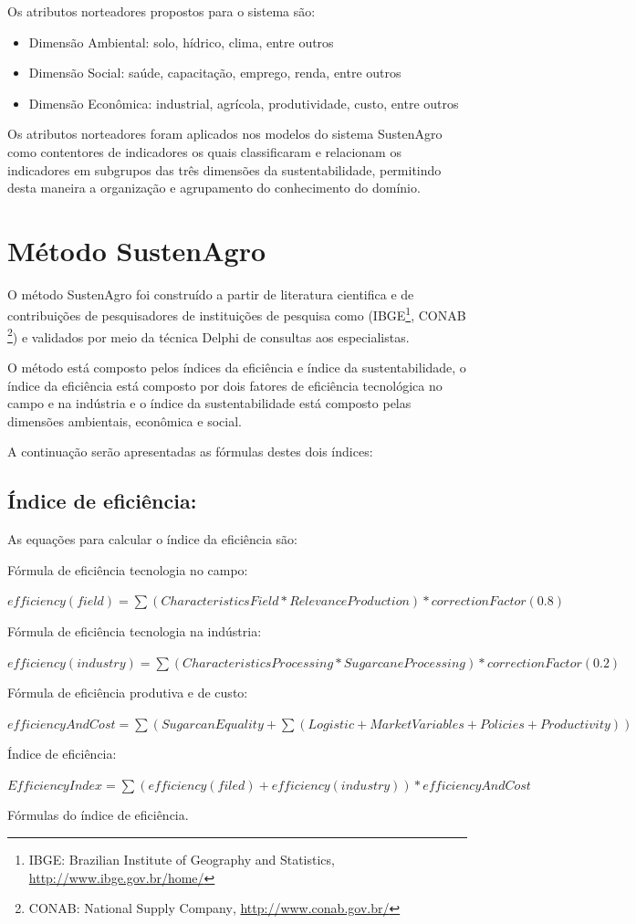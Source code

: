 Os atributos norteadores propostos para o sistema são:
\begin{itemize}
\item Dimensão Ambiental: solo, hídrico, clima, entre outros
\item Dimensão Social: saúde, capacitação, emprego, renda, entre outros
\item Dimensão Econômica: industrial, agrícola, produtividade, custo, entre
outros
\end{itemize}
Os atributos norteadores foram aplicados nos modelos do sistema SustenAgro
como contentores de indicadores os quais classificaram e relacionam
os indicadores em subgrupos das três dimensões da sustentabilidade,
permitindo desta maneira a organização e agrupamento do conhecimento
do domínio.

\section{Método SustenAgro}

O método SustenAgro foi construído a partir de literatura cientifica
e de contribuições de pesquisadores de instituições de pesquisa como
(IBGE\footnote{IBGE: \foreignlanguage{english}{Brazilian Institute of Geography and
Statistics}, \url{http://www.ibge.gov.br/home/}}, CONAB \footnote{CONAB: \foreignlanguage{english}{National Supply Company}, \url{http://www.conab.gov.br/}})
e validados por meio da técnica \foreignlanguage{english}{Delphi}
de consultas aos especialistas.

O método está composto pelos índices da eficiência e índice da sustentabilidade,
o índice da eficiência está composto por dois fatores de eficiência
tecnológica no campo e na indústria e o índice da sustentabilidade
está composto pelas dimensões ambientais, econômica e social.

A continuação serão apresentadas as fórmulas destes dois índices:

\subsection*{Índice de eficiência:}

As equações para calcular o índice da eficiência são:

\begin{algorithm}[h]
Fórmula de eficiência tecnologia no campo:

$efficiency(field)=\sum(CharacteristicsField*RelevanceProduction)*correctionFactor(0.8)$

Fórmula de eficiência tecnologia na indústria:

$efficiency(industry)=\sum(CharacteristicsProcessing*SugarcaneProcessing)*correctionFactor(0.2)$

Fórmula de eficiência produtiva e de custo:

$efficiencyAndCost=\sum(SugarcanEquality+\sum(Logistic+MarketVariables+Policies+Productivity))$

Índice de eficiência:

$EfficiencyIndex=\sum(efficiency(filed)+efficiency(industry))*efficiencyAndCost$

\caption{Fórmulas do índice de eficiência.}
\end{algorithm}


